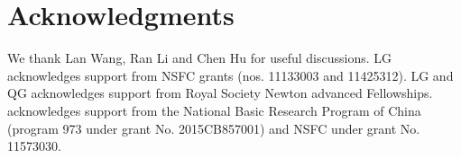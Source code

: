 \documentclass[useAMS,usenatbib]{mn2e}
\begin{document}
\section*{Acknowledgments}
We thank Lan Wang, Ran Li and Chen Hu for useful discussions. LG acknowledges support from NSFC grants (nos. 11133003 and 11425312). LG and QG acknowledges support from Royal Society Newton advanced Fellowships. acknowledges support from the National Basic Research Program of China (program 973 under grant No. 2015CB857001) and NSFC under grant No. 11573030.



\begin{thebibliography}{}


\end{thebibliography}
\end{document}
